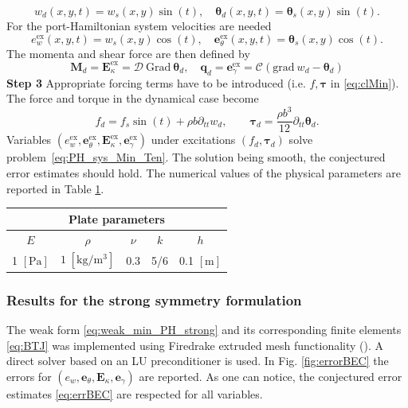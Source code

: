 \documentclass{ifacconf}
\begin{document}
\[
w_d(x,y,t) = w_s(x,y) \sin(t), \quad \bm{\theta}_d(x,y,t) = \bm\theta_s(x,y) \sin(t).
\]
For the port-Hamiltonian system velocities are needed
\[
e_w^\text{ex}(x,y,t) = w_s(x,y) \cos(t), \quad \bm{e}_\theta^\text{ex}(x,y,t) = \bm\theta_s(x,y) \cos(t).
\]
The momenta and shear force are then defined by
\[
\bm{M}_d = \bm{E}_\kappa^\text{ex} =  \mathcal{D} \ \mathrm{Grad} \ \bm{\theta}_d, \quad \bm{q}_d = \bm{e}_\gamma^\text{ex} = \mathcal{C}(\mathrm{grad} \ w_d - \bm{\theta}_d)
\]
\textbf{Step 3 } Appropriate forcing terms have to be introduced (i.e. $f, \bm{\tau}$ in \eqref{eq:clMin}). The force and torque in the dynamical case become
\begin{equation*}
f_d = f_s \sin(t) + \rho b \partial_{tt} w_d, \qquad
\bm{\tau}_d = \frac{\rho b^3}{12} \partial_{tt} \bm{\theta}_d.
\end{equation*}
Variables $(e_w^\text{ex}, \bm{e}_\theta^\text{ex}, \bm{E}_\kappa^\text{ex}, \bm{e}_\gamma^\text{ex})$ under excitations $(f_d, \bm{\tau}_d)$ solve problem~\eqref{eq:PH_sys_Min_Ten}. The solution being smooth, the conjectured error estimates should hold. The numerical values of the physical parameters are reported in Table \ref{tab:parMin}.

\begin{table}[h]
	\centering
	\begin{tabular}{ccccc}
		\hline 
		\multicolumn{5}{c}{Plate parameters} \\ 
		\hline 
		$E$ & $\rho$ & $\nu$ & $k$ & $h$ \\
		1 $[\textrm{Pa}]$ & $1\; [\textrm{kg}/\textrm{m}^3]$ & 0.3 & 5/6 & 0.1 $[\textrm{m}]$\\ 
		\hline 
	\end{tabular} 
	\captionsetup{width=0.95\linewidth}
	\vspace{1mm}
	\label{tab:parMin}
\end{table}

\subsubsection{Results for the strong symmetry formulation} 

The weak form \eqref{eq:weak_min_PH_strong} and its corresponding finite elements \eqref{eq:BTJ} was implemented using Firedrake extruded mesh functionality (\cite{firedrake_extruded}). A direct solver based on an LU preconditioner is used. In Fig. \ref{fig:errorBEC} the errors for $(e_w, \bm{e}_\theta, \bm{E}_\kappa, \bm{e}_\gamma)$ are reported. As one can notice, the conjectured error estimates \eqref{eq:errBEC} are respected for all variables. 
\end{document}
